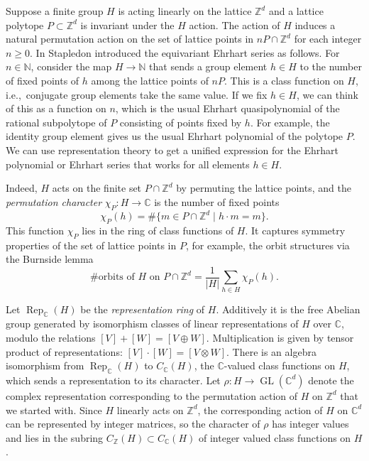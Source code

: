 \documentclass[12pt,reqno]{amsart}
\theoremstyle{definition}
\theoremstyle{remark}
\newcommand{\C}{\mathbb{C}}
\newcommand{\N}{\mathbb{N}}
\newcommand{\Z}{\mathbb{Z}}
\begin{document}
Suppose a finite group $H$ is acting linearly on the lattice $\Z^d$ and a lattice polytope $P \subset \Z^d$ is invariant under the $H$ action. The action of $H$ induces a natural permutation action on the set of lattice points in $nP \cap \Z^d$ for each integer $n\geq 0$. 
In \cite{StapledonEquivariant} Stapledon introduced the equivariant Ehrhart series as follows. For $n\in \N$, consider the map $H \rightarrow \N$ that sends a group element $h\in H$ to the number of fixed points of $h$ among the lattice points of $nP$.  This is a class function on $H$, i.e.,\ conjugate group elements take the same value.  If we fix $h\in H$, we can think of this as a function on $n$, which is the usual Ehrhart quasipolynomial of the rational subpolytope of $P$ consisting of points fixed by $h$. For example, the identity group element gives us the usual Ehrhart polynomial of the polytope $P$. We can use representation theory to get a unified expression for the Ehrhart polynomial or Ehrhart series that works for all elements $h\in H$.


Indeed, $H$ acts on the finite set $P \cap \Z^d$ by permuting the lattice points, and the \emph{permutation character} $\chi_P \colon H \to \mathbb{C}$ is the number of fixed points
$$\chi_P(h) = \#\{ m \in P \cap \Z^d \mid h \cdot m = m \}.$$
This function $\chi_P$ lies in the ring of class functions of $H$. It captures symmetry properties of the set of lattice points in $P$, for example, the orbit structures via the Burnside lemma
    $$\# \text{orbits of } H \text{ on } P \cap \Z^d = \frac{1}{|H|} \sum_{h \in H} \chi_P(h).$$



Let $\mathop{Rep}_\C(H)$ be the {\em representation ring} of $H$.  Additively it is the free Abelian group generated by isomorphism classes of linear representations of $H$ over $\C$, modulo the relations $[V] + [W] = [V \oplus W]$. Multiplication is given by tensor product of representations: $[V]\cdot[W] = [V \otimes W]$.  There is an algebra isomorphism from $\mathop{Rep}_\C(H)$ to $C_\C(H)$, the $\C$-valued class functions on $H$, which sends a representation to its character.  
Let $\rho : H \rightarrow \mathop{GL}(\C^d)$ denote the complex representation corresponding to the permutation action of $H$ on $\Z^d$ that we started with. Since $H$  linearly acts on $\Z^d$, the corresponding action of $H$ on $\C^d$ can be represented by integer matrices, so the character of $\rho$ has integer values and lies in the subring $C_\Z(H) \subset C_\C(H)$ of integer valued class functions on $H$. 
\end{document}
